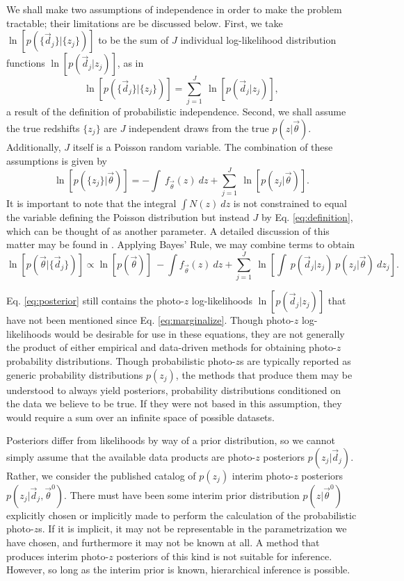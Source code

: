 \documentclass[preprint]{aastex}
\begin{document}
We shall make two assumptions of independence in order to make the problem 
tractable; their limitations are be discussed below.  First, we take 
$\ln[p(\{\vec{d}_{j}\}|\{z_{j}\})]$ to be the sum of $J$ individual 
log-likelihood distribution functions $\ln[p(\vec{d}_{j}|z_{j})]$, as in 
\begin{equation}\label{eq:indiedat} \ln[p(\{\vec{d}_{j}\}|\{z_{j}\})] = 
\sum_{j=1}^{J}\ \ln[p(\vec{d}_{j}|z_{j})],\end{equation} a result of the 
definition of probabilistic independence.  Second, we shall assume the true 
redshifts $\{z_{j}\}$ are $J$ independent draws from the true 
$p(z|\vec{\theta})$.  Additionally, $J$ itself is a Poisson random variable.  
The combination of these assumptions is given by 
\begin{equation}\label{eq:indie} \ln[p(\{z_{j}\}|\vec{\theta})] = -\int\ 
f_{\vec{\theta}}(z)\ dz +  \sum_{j=1}^{J}\ 
\ln[p(z_{j}|\vec{\theta})].\end{equation}  It is important to note that the 
integral $\int N(z)\ dz$ is not constrained to equal the variable defining the 
Poisson distribution but instead $J$ by Eq. \ref{eq:definition}, which can be 
thought of as another parameter.  A detailed discussion of this matter may be 
found in \citet{ForemanMackey2014}.  Applying Bayes' Rule, we may combine terms 
to obtain \begin{equation}\label{eq:posterior} 
\ln[p(\vec{\theta}|\{\vec{d}_{j}\})] \propto \ln[p(\vec{\theta})]\ -\int 
f_{\vec{\theta}}(z)\ dz + \sum_{j=1}^{J}\ \ln\left[\int\ p(\vec{d}_{j}|z_{j})\ 
p(z_{j}|\vec{\theta})\ dz_{j}\right].\end{equation}

Eq. \ref{eq:posterior} still contains the photo-$z$ log-likelihoods 
$\ln[p(\vec{d}_{j}|z_{j})]$ that have not been mentioned since Eq. 
\ref{eq:marginalize}.  Though photo-$z$ log-likelihoods would be desirable for 
use in these equations, they are not generally the product of either empirical 
and data-driven methods for obtaining photo-$z$ probability distributions.  
Though probabilistic photo-$z$s are typically reported as generic probability 
distributions $p(z_{j})$, the methods that produce them may be understood to 
always yield posteriors, probability distributions conditioned on the data we 
believe to be true.  If they were not based in this assumption, they would 
require a sum over an infinite space of possible datasets.

Posteriors differ from likelihoods by way of a prior distribution, so we cannot 
simply assume that the available data products are photo-$z$ posteriors 
$p(z_{j}|\vec{d}_{j})$.  Rather, we consider the published catalog of 
$p(z_{j})$ interim photo-$z$ posteriors 
$p(z_{j}|\vec{d}_{j},\vec{\theta}^{0})$.  There must have been some interim 
prior distribution $p(z|\vec{\theta}^{0})$ explicitly chosen or implicitly made 
to perform the calculation of the probabilistic photo-$z$s.  If it is implicit, 
it may not be representable in the parametrization we have chosen, and 
furthermore it may not be known at all.  A method that produces interim 
photo-$z$ posteriors of this kind is not suitable for inference.  However, so 
long as the interim prior is known, hierarchical inference is possible.
\end{document}
